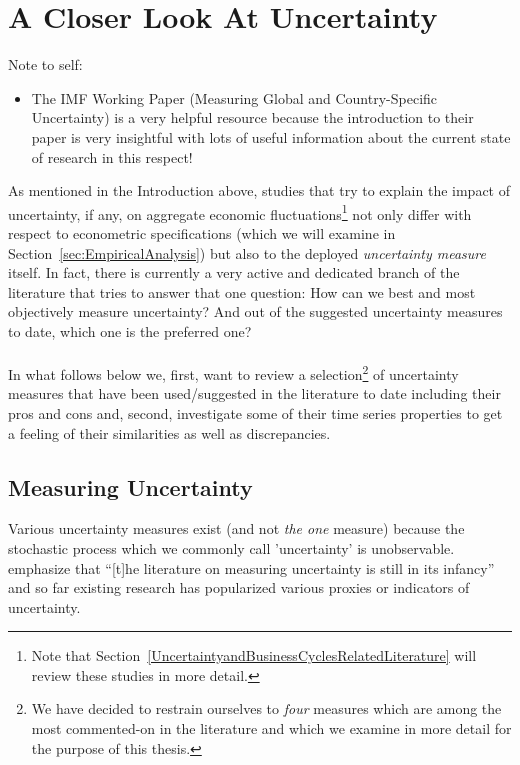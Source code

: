 \documentclass[a4paper,12pt,oneside,pointednumbers,bibtotoc,bigheadings,liststotoc]{scrbook}
\begin{document}
\chapter{A Closer Look At Uncertainty}
\label{MeasuringUncertaintyandaHistoricalView}

\begingroup
    \fontsize{8pt}{12pt}\selectfont
    Note to self:
\begin{itemize}
	\item  The IMF Working Paper (Measuring Global and Country-Specific Uncertainty) is a very helpful resource because the introduction to their paper is very insightful with lots of useful information about the current state of research in this respect!
\end{itemize}
\endgroup


As mentioned in the Introduction above, studies that try to explain the impact of uncertainty, if any, on aggregate economic fluctuations\footnote{Note that Section~\ref{UncertaintyandBusinessCyclesRelatedLiterature} will review these studies in more detail.} not only differ with respect to econometric specifications (which we will examine in Section~\ref{sec:EmpiricalAnalysis}) but also to the deployed \textit{uncertainty measure} itself. In fact, there is currently a very active and dedicated branch of the literature that tries to answer that one question: How can we best and most objectively measure uncertainty? And out of the suggested uncertainty measures to date, which one is the preferred one?\\
\\
In what follows below we, first, want to review a selection\footnote{We have decided to restrain ourselves to \textit{four} measures which are among the most commented-on in the literature and which we examine in more detail for the purpose of this thesis.} of uncertainty measures that have been used/suggested in the literature to date including their pros and cons and, second, investigate some of their time series properties to get a feeling of their similarities as well as discrepancies.

\section{Measuring Uncertainty}
Various uncertainty measures exist (and not \textit{the one} measure) because the stochastic process which we commonly call 'uncertainty' is unobservable. \citet[p. 1182]{juradoetal:15} emphasize that ``[t]he literature on measuring uncertainty is still in its infancy'' and so far existing research has popularized various proxies or indicators of uncertainty.
\end{document}

